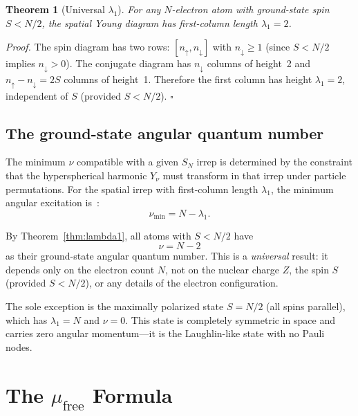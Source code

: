 \documentclass[aps,prl,twocolumn,superscriptaddress,longbibliography]{revtex4-2}
\newcommand{\mufree}{\mu_{\mathrm{free}}}
\begin{document}
\noindent\textbf{Theorem 1} (Universal $\lambda_1$).
\label{thm:lambda1}
\textit{For any $N$-electron atom with ground-state spin $S < N/2$, the
spatial Young diagram has first-column length $\lambda_1 = 2$.}

\medskip\noindent\textit{Proof.}
The spin diagram has two rows: $[n_\uparrow, n_\downarrow]$ with
$n_\downarrow \geq 1$ (since $S < N/2$ implies $n_\downarrow > 0$).
The conjugate diagram has $n_\downarrow$ columns of height~2 and
$n_\uparrow - n_\downarrow = 2S$ columns of height~1.  Therefore the
first column has height $\lambda_1 = 2$, independent of $S$ (provided
$S < N/2$). \hfill$\square$

\subsection{The ground-state angular quantum number}
\label{sec:nu_gs}

The minimum $\nu$ compatible with a given $S_N$ irrep is determined by
the constraint that the hyperspherical harmonic $Y_\nu$ must transform
in that irrep under particle permutations.  For the spatial irrep with
first-column length $\lambda_1$, the minimum angular excitation
is~\cite{Avery2000}:
\begin{equation}
  \nu_{\min} = N - \lambda_1.
  \label{eq:nu_min}
\end{equation}

By Theorem~\ref{thm:lambda1}, all atoms with $S < N/2$ have
\begin{equation}
  \boxed{\nu = N - 2}
  \label{eq:nu_universal}
\end{equation}
as their ground-state angular quantum number.  This is a
\emph{universal} result: it depends only on the electron count $N$,
not on the nuclear charge $Z$, the spin $S$ (provided $S < N/2$), or
any details of the electron configuration.

The sole exception is the maximally polarized state $S = N/2$ (all
spins parallel), which has $\lambda_1 = N$ and $\nu = 0$.  This state
is completely symmetric in space and carries zero angular momentum---it
is the Laughlin-like state with no Pauli nodes.


\section{The $\mufree$ Formula}
\label{sec:mu_formula}
\end{document}
